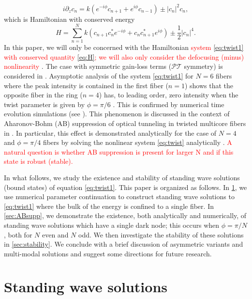 \documentclass[reprint, amsmath,amssymb,aps,pra]{revtex4-2}
\renewcommand{\revised}[1]{ \textcolor{red}{#1} }
\newcommand{\revision}[1]{ \textcolor{red}{#1} }
\begin{document}
\begin{equation}\label{eq:twist1}
i \partial_z c_n = k \left(e^{-i\phi}c_{n+1} + e^{i\phi}c_{n-1}\right)  \pm |c_n|^2 c_n,
\end{equation}
which is Hamiltonian with conserved energy
\begin{equation}\label{eq:H}
H = \sum_{n=1}^N k (c_{n+1}c_n^* e^{-i \phi} + c_n c_{n+1}^* e^{i \phi}) \pm \frac{1}{2}|c_n|^4.
\end{equation}
In this paper, we will only be concerned with the Hamiltonian \revised{system \cref{eq:twist1} with conserved quantity \cref{eq:H}; we will also only consider the defocusing (minus) nonlinearity}. The case with symmetric gain-loss terms ($\mathcal{PT}$ symmetry) is considered in \cite{castro2016}. Asymptotic analysis of the system \cref{eq:twist1} for $N=6$ fibers where the peak intensity is contained in the first fiber ($n=1$) shows that the opposite fiber in the ring ($n=4$) has, to leading order, zero intensity when the twist parameter is given by $\phi = \pi/6$ \cite{castro2016}. This is confirmed by numerical time evolution simulations (see \cite[Figures 4 and 5]{castro2016}). This phenomenon is discussed in the context of Aharonov-Bohm (AB) suppression of optical tunneling in twisted multicore fibers in \cite{Parto2017,Parto2019}. In particular, this effect is demonstrated analytically for the case of $N = 4$ and $\phi = \pi/4$ fibers by solving the nonlinear system \cref{eq:twist} analytically \cite{Parto2019}. \revision{A natural question is whether AB suppression is present for larger N and if this state is robust (stable).}

In what follows, we study the existence and stability of standing wave solutions (bound states) of equation \cref{eq:twist1}. This paper is organized as follows. In \cref{sec:standingwave}, we use numerical parameter continuation to construct standing wave solutions to \cref{eq:twist1} where the bulk of the energy is confined to a single fiber. In \cref{sec:ABsupp}, we demonstrate the existence, both analytically and numerically, of standing wave solutions which have a single dark node; this occurs when $\phi = \pi/N$, both for $N$ even and $N$ odd. We then investigate the stability of these solutions in \cref{sec:stability}. We conclude with a brief discussion of asymmetric variants and multi-modal solutions and suggest some directions for future research.

\section{Standing wave solutions}\label{sec:standingwave}
\end{document}

